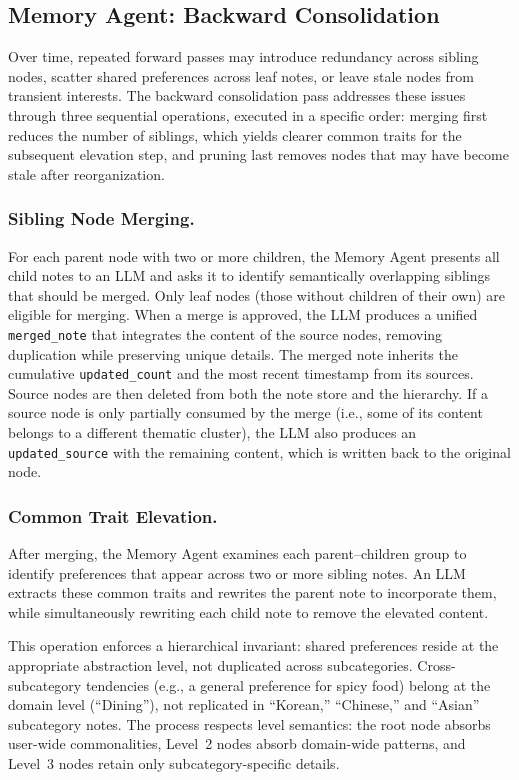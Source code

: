 \documentclass[manuscript,screen,review]{acmart}
\begin{document}
\subsection{Memory Agent: Backward Consolidation}

Over time, repeated forward passes may introduce redundancy across sibling nodes, scatter shared preferences across leaf notes, or leave stale nodes from transient interests. The backward consolidation pass addresses these issues through three sequential operations, executed in a specific order: merging first reduces the number of siblings, which yields clearer common traits for the subsequent elevation step, and pruning last removes nodes that may have become stale after reorganization.

\subsubsection{Sibling Node Merging.}
For each parent node with two or more children, the Memory Agent presents all child notes to an LLM and asks it to identify semantically overlapping siblings that should be merged. Only leaf nodes (those without children of their own) are eligible for merging. When a merge is approved, the LLM produces a unified \texttt{merged\_note} that integrates the content of the source nodes, removing duplication while preserving unique details. The merged note inherits the cumulative \texttt{updated\_count} and the most recent timestamp from its sources. Source nodes are then deleted from both the note store and the hierarchy. If a source node is only partially consumed by the merge (i.e., some of its content belongs to a different thematic cluster), the LLM also produces an \texttt{updated\_source} with the remaining content, which is written back to the original node.

\subsubsection{Common Trait Elevation.}
After merging, the Memory Agent examines each parent--children group to identify preferences that appear across two or more sibling notes. An LLM extracts these common traits and rewrites the parent note to incorporate them, while simultaneously rewriting each child note to remove the elevated content.

This operation enforces a hierarchical invariant: shared preferences reside at the appropriate abstraction level, not duplicated across subcategories. Cross-subcategory tendencies (e.g., a general preference for spicy food) belong at the domain level (``Dining''), not replicated in ``Korean,'' ``Chinese,'' and ``Asian'' subcategory notes. The process respects level semantics: the root node absorbs user-wide commonalities, Level~2 nodes absorb domain-wide patterns, and Level~3 nodes retain only subcategory-specific details.
\end{document}

